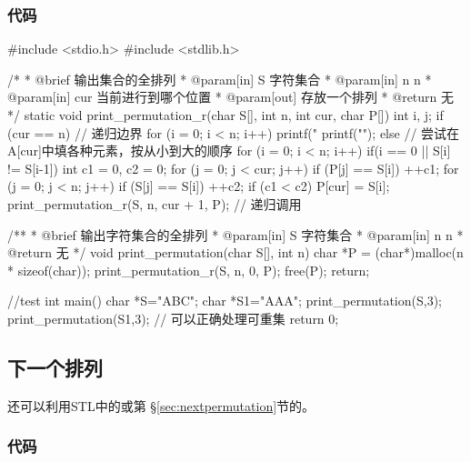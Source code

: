 \subsubsection{代码}

\begin{Codex}[label=print_permutation.c]
#include <stdio.h>
#include <stdlib.h>

/*
 * @brief 输出集合的全排列
 * @param[in] S 字符集合
 * @param[in] n n
 * @param[in] cur 当前进行到哪个位置
 * @param[out] 存放一个排列
 * @return 无
 */
static void print_permutation_r(char S[], int n, int cur, char P[]) {
    int i, j;
    if (cur == n) { // 递归边界
        for (i = 0; i < n; i++)
            printf("%
        printf("\n");
    } else {
        // 尝试在A[cur]中填各种元素，按从小到大的顺序
        for (i = 0; i < n; i++) if(i == 0 || S[i] != S[i-1]){
            int c1 = 0, c2 = 0;
            for (j = 0; j < cur; j++) if (P[j] == S[i]) ++c1;
            for (j = 0; j < n; j++) if (S[j] == S[i]) ++c2;
            if (c1 < c2) {
                P[cur] = S[i];
                print_permutation_r(S, n, cur + 1, P); // 递归调用
            }
        }
    }
}

/**
 * @brief 输出字符集合的全排列
 * @param[in] S 字符集合
 * @param[in] n n
 * @return 无
 */
void print_permutation(char S[], int n) {
    char *P = (char*)malloc(n * sizeof(char));
    print_permutation_r(S, n, 0, P);
    free(P);
    return;
}

//test
int main() {
    char *S="ABC";
    char *S1="AAA";
    print_permutation(S,3);
    print_permutation(S1,3); // 可以正确处理可重集
    return 0;
}
\end{Codex}


\subsection{下一个排列}
还可以利用STL中的或第 \S \ref{sec:nextpermutation}节的。

\subsubsection{代码}

